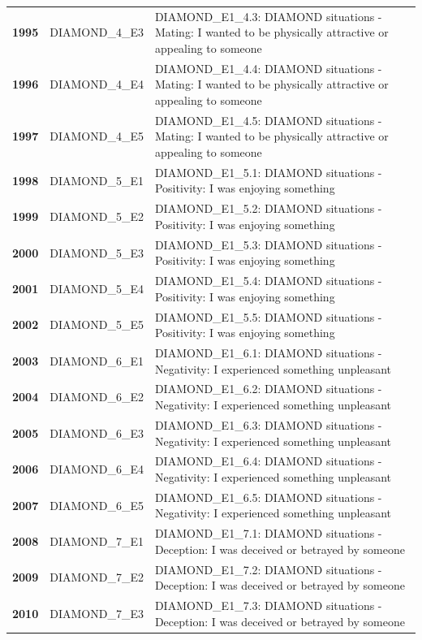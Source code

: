 \documentclass[
  letterpaper,
  DIV=11,
  numbers=noendperiod]{scrartcl}
\begin{document}
\begin{longtable}[t]{>{}cll}
\textbf{1995} & DIAMOND\_4\_E3 & DIAMOND\_E1\_4.3: DIAMOND situations - Mating: I wanted to be physically attractive or appealing to someone\\
\addlinespace
\textbf{1996} & DIAMOND\_4\_E4 & DIAMOND\_E1\_4.4: DIAMOND situations - Mating: I wanted to be physically attractive or appealing to someone\\
\textbf{1997} & DIAMOND\_4\_E5 & DIAMOND\_E1\_4.5: DIAMOND situations - Mating: I wanted to be physically attractive or appealing to someone\\
\textbf{1998} & DIAMOND\_5\_E1 & DIAMOND\_E1\_5.1: DIAMOND situations - Positivity: I was enjoying something\\
\textbf{1999} & DIAMOND\_5\_E2 & DIAMOND\_E1\_5.2: DIAMOND situations - Positivity: I was enjoying something\\
\textbf{2000} & DIAMOND\_5\_E3 & DIAMOND\_E1\_5.3: DIAMOND situations - Positivity: I was enjoying something\\
\addlinespace
\textbf{2001} & DIAMOND\_5\_E4 & DIAMOND\_E1\_5.4: DIAMOND situations - Positivity: I was enjoying something\\
\textbf{2002} & DIAMOND\_5\_E5 & DIAMOND\_E1\_5.5: DIAMOND situations - Positivity: I was enjoying something\\
\textbf{2003} & DIAMOND\_6\_E1 & DIAMOND\_E1\_6.1: DIAMOND situations - Negativity: I experienced something unpleasant\\
\textbf{2004} & DIAMOND\_6\_E2 & DIAMOND\_E1\_6.2: DIAMOND situations - Negativity: I experienced something unpleasant\\
\textbf{2005} & DIAMOND\_6\_E3 & DIAMOND\_E1\_6.3: DIAMOND situations - Negativity: I experienced something unpleasant\\
\addlinespace
\textbf{2006} & DIAMOND\_6\_E4 & DIAMOND\_E1\_6.4: DIAMOND situations - Negativity: I experienced something unpleasant\\
\textbf{2007} & DIAMOND\_6\_E5 & DIAMOND\_E1\_6.5: DIAMOND situations - Negativity: I experienced something unpleasant\\
\textbf{2008} & DIAMOND\_7\_E1 & DIAMOND\_E1\_7.1: DIAMOND situations - Deception: I was deceived or betrayed by someone\\
\textbf{2009} & DIAMOND\_7\_E2 & DIAMOND\_E1\_7.2: DIAMOND situations - Deception: I was deceived or betrayed by someone\\
\textbf{2010} & DIAMOND\_7\_E3 & DIAMOND\_E1\_7.3: DIAMOND situations - Deception: I was deceived or betrayed by someone\\

\end{longtable}
\end{document}
